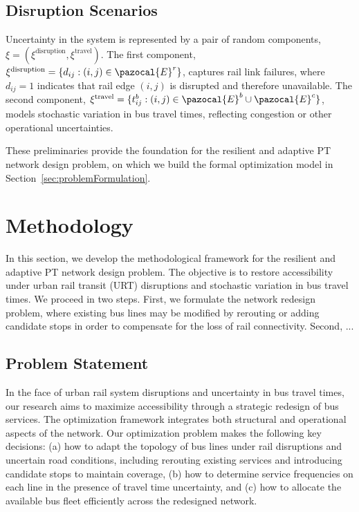 \documentclass[3p,times,procedia]{elsarticle}
\begin{document}
\subsection{Disruption Scenarios}
Uncertainty in the system is represented by a pair of random components, $\xi = (\xi^{\text{disruption}}, \xi^{\text{travel}})$.  
The first component, $\xi^{\text{disruption}} = \{d_{ij} : (i,j) \in \pazocal{E}^r\}$, captures rail link failures, where $d_{ij}=1$ indicates that rail edge $(i,j)$ is disrupted and therefore unavailable. %
The second component, $\xi^{\text{travel}} = \{t_{ij}^b : (i,j) \in \pazocal{E}^b \cup \pazocal{E}^c\}$, models stochastic variation in bus travel times, reflecting congestion or other operational uncertainties.  

These preliminaries provide the foundation for the resilient and adaptive PT network design problem, on which we build the formal optimization model in Section~\ref{sec:problemFormulation}.

\section{Methodology}
In this section, we develop the methodological framework for the resilient and adaptive PT network design problem. 
The objective is to restore accessibility under urban rail transit (URT) disruptions and stochastic variation in bus travel times. 
%
We proceed in two steps. 
First, we formulate the network redesign problem, where existing bus lines may be modified by rerouting or adding candidate stops in order to compensate for the loss of rail connectivity. 
Second, 
% 
...


\subsection{Problem Statement}
In the face of urban rail system disruptions and uncertainty in bus travel times, our research aims to maximize accessibility through a strategic redesign of bus services. 
The optimization framework integrates both structural and operational aspects of the network. 
Our optimization problem makes the following key decisions:  
(a) how to adapt the topology of bus lines under rail disruptions and uncertain road conditions, including rerouting existing services and introducing candidate stops to maintain coverage,  
(b) how to determine service frequencies on each line in the presence of travel time uncertainty, and  
(c) how to allocate the available bus fleet efficiently across the redesigned network.  
\end{document}
